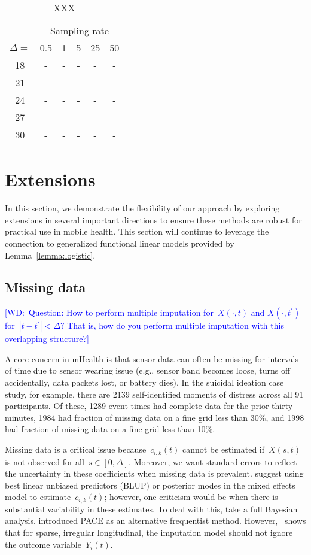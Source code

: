 \documentclass[12pt]{amsart}
\newcommand{\walt}[1]{\textcolor{blue}{[WD:\ #1]}}
\begin{document}
\begin{table}[!th]
\begin{tabular}{c c c c c c}
& \multicolumn{5}{c}{Sampling rate} \\ \cline{2-6}
$\Delta=$ & 0.5 & 1 & 5 & 25 & 50 \\ \hline
18  & - & - & - & - & -  \\
21 & - & - & - & - & -  \\
24 & - & - & - & - & -  \\
27 & - & - & - & - & -  \\
30 & - & - & - & - & -  \\ \hline
\end{tabular}
\caption{XXX}
\label{tab:mise}
\end{table}


\section{Extensions}

In this section, we demonstrate the flexibility of our approach by exploring extensions in several important directions to ensure these methods are robust for practical use in mobile health. This section will continue to leverage the connection to generalized functional linear models provided by Lemma~\ref{lemma:logistic}.

\subsection{Missing data}
\label{section:missingdata}
\walt{Question: How to perform multiple imputation for~$X(\cdot,t)$
  and $X(\cdot, t^\prime)$ for~$|t - t^\prime| <\Delta$? That is, how
  do you perform multiple imputation with this overlapping structure?}

A core concern in mHealth is that sensor data can often be missing for intervals of time due to sensor wearing issue (e.g., sensor band becomes loose, turns off accidentally, data packets lost, or battery dies). In the suicidal ideation case study, for example, there are 2139 self-identified moments of distress across all 91 participants. Of these, 1289 event times had complete data for the prior thirty minutes, 1984 had fraction of missing data on a fine grid less than 30\%, and 1998 had fraction of missing data on a fine grid less than 10\%.

Missing data is a critical issue because~$c_{i,k} (t)$ cannot be estimated if~$X(s,t)$ is not observed for all~$s \in [0,\Delta]$. Moreover, we want standard errors to reflect the uncertainty in these coefficients when missing data is prevalent. \cite{Goldsmith2011} suggest using best linear unbiased predictors (BLUP) or posterior modes in the mixed effects model to estimate~$c_{i,k} (t)$; however, one criticism would be when there is substantial variability in these estimates.  To deal with this, \cite{Crainiceanu2010} take a full Bayesian analysis. \cite{Yao2005} introduced PACE as an alternative frequentist method. However,~\cite{Petrovich2018} shows that for sparse, irregular longitudinal, the imputation model should not ignore the outcome variable~$Y_i (t)$.
\end{document}
